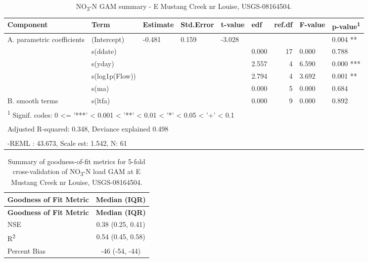 \documentclass[
]{article}
\newenvironment{widestuff}{\begin{table}[h]\begin{adjustwidth}{-4.5cm}{-4.5cm}\centering}{\end{adjustwidth}\end{table}}
\begin{document}
\begin{widestuff}

\caption{NO\textsubscript{3}-N GAM summary - E Mustang Creek nr Louise, USGS-08164504.}
\centering
\begin{tabular}[t]{llllllrll}
\toprule
Component & Term & Estimate & Std.Error & t-value & edf & ref.df & F-value & p-value\textsuperscript{1}\\
\midrule
A. parametric coefficients & (Intercept) & -0.481 & 0.159 & -3.028 &  &  &  & 0.004 **\\
\cmidrule{1-9}
 & s(ddate) &  &  &  & 0.000 & 17 & 0.000 & 0.788\\

 & s(yday) &  &  &  & 2.557 & 4 & 6.590 & 0.000 ***\\

 & s(log1p(Flow)) &  &  &  & 2.794 & 4 & 3.692 & 0.001 **\\

 & s(ma) &  &  &  & 0.000 & 5 & 0.000 & 0.684\\

\multirow[t]{-5}{*}{\raggedright\arraybackslash B. smooth terms} & s(ltfa) &  &  &  & 0.000 & 9 & 0.000 & 0.892\\
\bottomrule
\multicolumn{9}{l}{\textsuperscript{1} Signif. codes: 0 <= '***' < 0.001 < '**' < 0.01 < '*' < 0.05 < '+' < 0.1}\\
\multicolumn{9}{l}{\textsuperscript{} Adjusted R-squared: 0.348, Deviance explained 0.498}\\
\multicolumn{9}{l}{\textsuperscript{} -REML : 43.673, Scale est: 1.542, N: 61}\\
\end{tabular}
\end{widestuff}

\hypertarget{tbl-NO308164504-CV}{}
\begin{longtable}[]{@{}lc@{}}
\caption{\label{tbl-NO308164504-CV}Summary of goodness-of-fit metrics
for 5-fold cross-validation of NO\textsubscript{3}-N load GAM at E
Mustang Creek nr Louise, USGS-08164504.}\tabularnewline
\toprule()
\textbf{Goodness of Fit Metric} & \textbf{Median (IQR)} \\
\midrule()
\endfirsthead
\toprule()
\textbf{Goodness of Fit Metric} & \textbf{Median (IQR)} \\
\midrule()
\endhead
NSE & 0.38 (0.25, 0.41) \\
R\textsuperscript{2} & 0.54 (0.45, 0.58) \\
Percent Bias & -46 (-54, -44) \\
\bottomrule()
\end{longtable}
\end{document}
